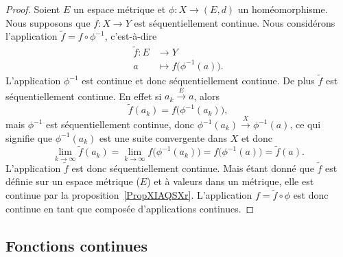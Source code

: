 \begin{proof}
    Soient \( E\) un espace métrique et \( \phi\colon X\to (E,d)\) un homéomorphisme. Nous supposons que \( f\colon X\to Y\) est séquentiellement continue. Nous considérons l'application \( \tilde f=f\circ\phi^{-1}\), c'est-à-dire
    \begin{equation}
        \begin{aligned}
            \tilde f\colon E&\to Y \\
            a&\mapsto f\big( \phi^{-1}(a) \big).
        \end{aligned}
    \end{equation}
    L'application \( \phi^{-1}\) est continue et donc séquentiellement continue. De plus \( \tilde f\) est séquentiellement continue. En effet si \( a_k\stackrel{E}{\longrightarrow}a\), alors
    \begin{equation}
        \tilde f(a_k)=f\big( \phi^{-1}(a_k) \big),
    \end{equation}
    mais \( \phi^{-1}\) est séquentiellement continue, donc \( \phi^{-1}(a_k)\stackrel{X}{\longrightarrow}\phi^{-1}(a)\), ce qui signifie que \( \phi^{-1}(a_k)\) est une suite convergente dans \( X\) et donc
    \begin{equation}
        \lim_{k\to \infty} \tilde f(a_k)=\lim_{k\to \infty} f\big( \phi^{-1}(a_k) \big)=f\big( \phi^{-1}(a) \big)=\tilde f(a).
    \end{equation}
    L'application \( \tilde f\) est donc séquentiellement continue. Mais étant donné que \( \tilde f\) est définie sur un espace métrique (\( E\)) et à valeurs dans un métrique, elle est continue par la proposition~\ref{PropXIAQSXr}. L'application \( f=\tilde f\circ\phi\) est donc continue en tant que composée d'applications continues.
\end{proof}

\subsection{Fonctions continues}

